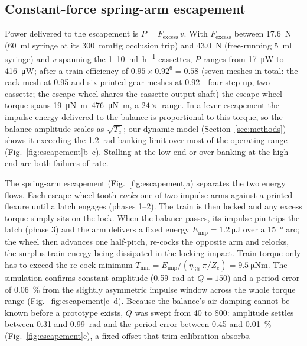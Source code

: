 \documentclass[11pt,a4paper]{article}
\begin{document}
\subsection{Constant-force spring-arm escapement}
Power delivered to the escapement is $P = F_{\mathrm{excess}}\,v$. With $F_{\mathrm{excess}}$ between \SI{17.6}{\newton} (\SI{60}{\milli\litre} syringe at its \SI{300}{mmHg} occlusion trip) and \SI{43.0}{\newton} (free-running \SI{5}{\milli\litre} syringe) and $v$ spanning the 1--\SI{10}{\milli\litre\per\hour} cassettes, $P$ ranges from \SI{17}{\micro\watt} to \SI{416}{\micro\watt}; after a train efficiency of $0.95\times0.92^{6} = 0.58$ (seven meshes in total: the rack mesh at 0.95 and six printed gear meshes at 0.92---four step-up, two cassette; the escape wheel shares the cassette output shaft) the escape-wheel torque spans \SIrange{19}{476}{\micro\newton\metre}, a $24\times$ range. In a lever escapement the impulse energy delivered to the balance is proportional to this torque, so the balance amplitude scales as $\sqrt{T_e}$; our dynamic model (Section~\ref{sec:methods}) shows it exceeding the \SI{1.2}{\radian} banking limit over most of the operating range (Fig.~\ref{fig:escapement}b--c). Stalling at the low end or over-banking at the high end are both failures of rate.

The spring-arm escapement (Fig.~\ref{fig:escapement}a) separates the two energy flows. Each escape-wheel tooth \emph{cocks} one of two impulse arms against a printed flexure until a latch engages (phases 1--2). The train is then locked and any excess torque simply sits on the lock. When the balance passes, its impulse pin trips the latch (phase 3) and the arm delivers a fixed energy $E_{\mathrm{imp}} = \SI{1.2}{\micro\joule}$ over a \SI{15}{\degree} arc; the wheel then advances one half-pitch, re-cocks the opposite arm and relocks, the surplus train energy being dissipated in the locking impact. Train torque only has to exceed the re-cock minimum $T_{\min} = E_{\mathrm{imp}}/(\eta_{\mathrm{lift}}\,\pi/Z_e) = \SI{9.5}{\micro\newton\metre}$. The simulation confirms constant amplitude (\SI{0.59}{\radian} at $Q=150$) and a period error of \SI{0.06}{\percent} from the slightly asymmetric impulse window across the whole torque range (Fig.~\ref{fig:escapement}c--d). Because the balance's air damping cannot be known before a prototype exists, $Q$ was swept from 40 to 800: amplitude settles between \SI{0.31}{} and \SI{0.99}{\radian} and the period error between \SI{0.45}{} and \SI{0.01}{\percent} (Fig.~\ref{fig:escapement}e), a fixed offset that trim calibration absorbs.
\end{document}
